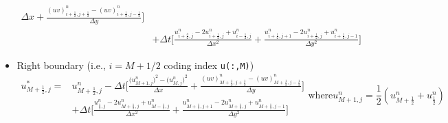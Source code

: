 \documentclass[12pt]{article}
\begin{document}
\begin{itemize}
\begin{equation}
\begin{aligned}
{                }{\Delta x} +
                \frac{
                    \left(uv\right)^{n}_{i+\frac{1}{2},j+\frac{1}{2}} - \left(uv\right)^{n}_{i+\frac{1}{2},j-\frac{1}{2}}
                }{\Delta y}
                \Bigg]\\
                & + \Delta t \Bigg[
                    \frac{
                        u^{n}_{i+\frac{3}{2},j} - 2u^{n}_{i+\frac{1}{2},j} + u^{n}_{i-\frac{1}{2},j}
                    }{\Delta x^{2}}
                 + 
                    \frac{
                        u^{n}_{i+\frac{1}{2},j+1} - 2u^{n}_{i+\frac{1}{2},j} + u^{n}_{i+\frac{1}{2},j-1}
                    }{\Delta y^{2}}
                    \Bigg]
            \end{aligned}
        \end{equation}
    \vspace{0.1in}
    \item Right boundary (i.e., $i=M+1/2$ coding index \texttt{u(:,M)})
        \begin{subequations}
            \begin{equation}
                \begin{aligned}
                    u^{\ast}_{M+\frac{1}{2},j} = &u^{n}_{M+\frac{1}{2},j}  -  \Delta t\Bigg[ 
                    \frac{
                        \big(u^{n}_{M+1,j}\big)^{2} - \big(u^{n}_{M,j}\big)^{2}
                    }{\Delta x} +
                    \frac{
                        \left(uv\right)^{n}_{M+\frac{1}{2},j+\frac{1}{2}} - \left(uv\right)^{n}_{M+\frac{1}{2},j-\frac{1}{2}}
                    }{\Delta y}
                    \Bigg]\\
                    & + \Delta t \Bigg[
                        \frac{
                            u^{n}_{\frac{1}{2},j} - 2u^{n}_{M+\frac{1}{2},j} + u^{n}_{M-\frac{1}{2},j}
                        }{\Delta x^{2}}
                     + 
                        \frac{
                            u^{n}_{M+\frac{1}{2},j+1} - 2u^{n}_{M+\frac{1}{2},j} + u^{n}_{M+\frac{1}{2},j-1}
                        }{\Delta y^{2}}
                        \Bigg]
                \end{aligned}
            \end{equation}
            \text{where}
            \begin{equation}
                u^{n}_{M+1,j} = \frac{1}{2} \left(u^{n}_{M+\frac{1}{2}} + u^{n}_{\frac{1}{2}} \right)
            \end{equation}
        \end{subequations}
\end{itemize}
\end{document}
